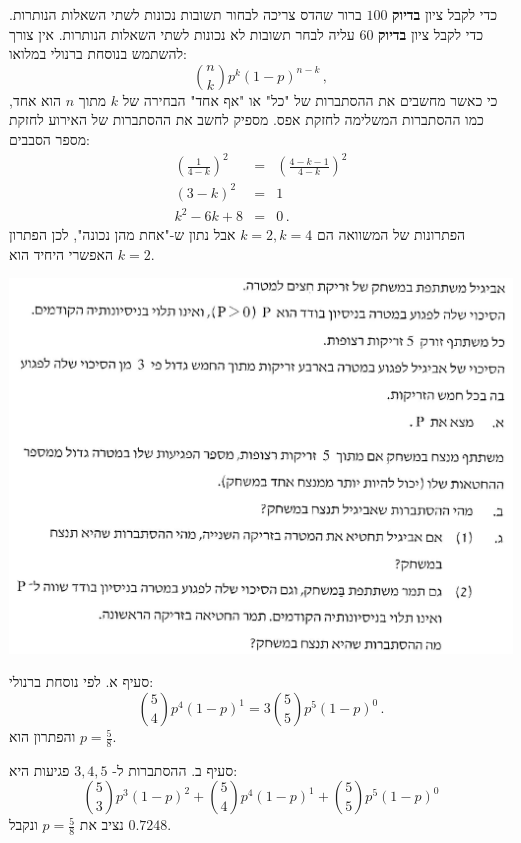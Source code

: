 \documentclass[12pt,a4paper]{article}
\begin{document}
כדי לקבל ציון 
\textbf{בדיוק}
$100$
ברור שהדס צריכה לבחור תשובות נכונות לשתי השאלות הנותרות. כדי לקבל ציון 
\textbf{בדיוק}
$60$
עליה לבחר תשובות לא נכונות לשתי השאלות הנותרות. אין צורך להשתמש בנוסחת ברנולי במלואו:
\[
{n \choose k}p^k(1-p)^{n-k}\,,
\]
כי כאשר מחשבים את ההסתברות של "כל" או "אף אחד" הבחירה של 
$k$
מתוך
$n$
הוא אחד, כמו ההסתברות המשלימה לחזקת אפס. מספיק לחשב את ההסתברות של האירוע לחזקת מספר הסבבים:
\begin{eqnarray*}
\left(\frac{1}{4-k}\right)^2 &=&\left(\frac{4-k-1}{4-k}\right)^2\\
(3-k)^2&=&1\\
k^2-6k+8&=& 0\,.
\end{eqnarray*}
הפתרונות של המשוואה הם 
$k=2,k=4$
אבל נתון ש-"אחת מהן נכונה", לכן הפתרון האפשרי היחיד הוא
$k=2$.


\textbf{}

\begin{center}
\includegraphics[width=.95\textwidth]{winter-2017-3.png}
\end{center}
\vspace{-1ex}

סעיף א. לפי נוסחת ברנולי:
\[
{5 \choose 4} p^4(1-p)^1 = 3{5\choose 5}p^5(1-p)^0\,.
\]
והפתרון הוא
$p=\frac{5}{8}$.

סעיף ב. ההסתברות ל-%
$3,4,5$
פגיעות היא:
\[
{5 \choose 3}p^3(1-p)^2 + {5 \choose 4}p^4(1-p)^1 + {5 \choose 5}p^5(1-p)^0
\]
נציב את
$p=\frac{5}{8}$
ונקבל
$0.7248$.
\end{document}
